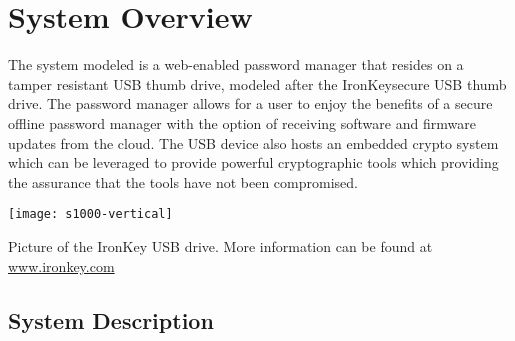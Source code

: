 \chapter{System Overview}
\label{ch:System Overview}
The system modeled is a web-enabled password manager that resides on a
tamper resistant USB thumb drive, modeled after the
IronKey\texttrademark secure USB thumb drive. The password manager
allows for a user to enjoy the benefits of a secure offline password
manager with the option of receiving software and firmware updates from the
cloud. The USB device also hosts an embedded crypto system which can be
leveraged to provide powerful cryptographic tools which providing the assurance
that the tools have not been compromised.

\begin{marginfigure}%
\centering
  \texttt{[image: s1000-vertical]}
  \caption{Picture of the IronKey USB drive.  More information can be
found at \url{www.ironkey.com}}
  \label{fig:ik}
\end{marginfigure}



\section{System Description}
\label{sec:sysdesc}

